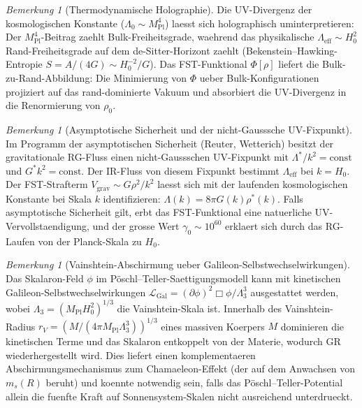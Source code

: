 \documentclass[12pt,a4paper]{article}
\theoremstyle{definition}
\theoremstyle{plain}
\theoremstyle{remark}
\newtheorem{remark}[definition]{Bemerkung}
\begin{document}
\begin{remark}[Thermodynamische Holographie]
\label{rem:thermo-holography}
Die UV-Divergenz der kosmologischen Konstante ($\Lambda_0 \sim M_{\mathrm{Pl}}^4$) laesst sich holographisch uminterpretieren: Der $M_{\mathrm{Pl}}^4$-Beitrag zaehlt Bulk-Freiheitsgrade, waehrend das physikalische $\Lambda_{\mathrm{eff}} \sim H_0^2$ Rand-Freiheitsgrade auf dem de-Sitter-Horizont zaehlt (Bekenstein--Hawking-Entropie $S = A/(4G) \sim H_0^{-2}/G$). Das FST-Funktional $\Phi[\rho]$ liefert die Bulk-zu-Rand-Abbildung: Die Minimierung von $\Phi$ ueber Bulk-Konfigurationen projiziert auf das rand-dominierte Vakuum und absorbiert die UV-Divergenz in die Renormierung von $\rho_0$.
\end{remark}

\begin{remark}[Asymptotische Sicherheit und der nicht-Gausssche UV-Fixpunkt]
\label{rem:asymptotic-safety-uv}
Im Programm der asymptotischen Sicherheit (Reuter, Wetterich) besitzt der gravitationale RG-Fluss einen nicht-Gaussschen UV-Fixpunkt mit $\Lambda^* / k^2 = \mathrm{const}$ und $G^* k^2 = \mathrm{const}$. Der IR-Fluss von diesem Fixpunkt bestimmt $\Lambda_{\mathrm{eff}}$ bei $k = H_0$. Der FST-Strafterm $V_{\mathrm{grav}} \sim G \rho^2 / k^2$ laesst sich mit der laufenden kosmologischen Konstante bei Skala $k$ identifizieren: $\Lambda(k) = 8\pi G(k) \rho^*(k)$. Falls asymptotische Sicherheit gilt, erbt das FST-Funktional eine natuerliche UV-Vervollstaendigung, und der grosse Wert $\gamma_0 \sim 10^{60}$ erklaert sich durch das RG-Laufen von der Planck-Skala zu $H_0$.
\end{remark}

\begin{remark}[Vainshtein-Abschirmung ueber Galileon-Selbstwechselwirkungen]
\label{rem:vainshtein}
Das Skalaron-Feld $\phi$ im P\"oschl--Teller-Saettigungsmodell kann mit kinetischen Galileon-Selbstwechselwirkungen $\mathcal{L}_{\mathrm{Gal}} = (\partial\phi)^2 \Box\phi / \Lambda_3^3$ ausgestattet werden, wobei $\Lambda_3 = (M_{\mathrm{Pl}} H_0^2)^{1/3}$ die Vainshtein-Skala ist. Innerhalb des Vainshtein-Radius $r_V = (M / (4\pi M_{\mathrm{Pl}} \Lambda_3^3))^{1/3}$ eines massiven Koerpers $M$ dominieren die kinetischen Terme und das Skalaron entkoppelt von der Materie, wodurch GR wiederhergestellt wird. Dies liefert einen komplementaeren Abschirmungsmechanismus zum Chamaeleon-Effekt (der auf dem Anwachsen von $m_s(R)$ beruht) und koennte notwendig sein, falls das P\"oschl--Teller-Potential allein die fuenfte Kraft auf Sonnensystem-Skalen nicht ausreichend unterdrueckt.
\end{remark}
\end{document}
